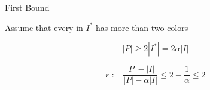 \begin{frame}{First Bound}

Assume that every \pack{} in $I^*$ has more than two colors


\pause
\begin{observation}
$$ |P| \geq 2 |I^*| = 2 \alpha |I| $$
\end{observation}

\pause
\begin{corollary}
$$r := \frac{|P| - |I|}{|P| - \alpha |I|} \leq 2 - \frac{1}{\alpha} \leq 2$$
\end{corollary}


\end{frame}

